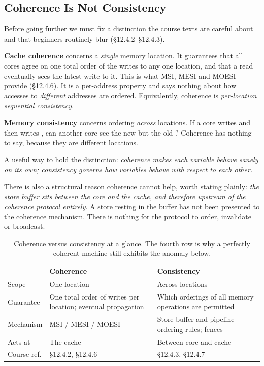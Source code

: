 \subsection{Coherence Is Not Consistency}

Before going further we must fix a distinction the course texts are careful
about and that beginners routinely blur (\S12.4.2--\S12.4.3).

\textbf{Cache coherence} concerns a \emph{single} memory location.
It guarantees that all cores agree on one total order of the writes to any one
location, and that a read eventually sees the latest write to it.
This is what MSI, MESI and MOESI provide (\S12.4.6).
It is a per-address property and says nothing about how accesses to
\emph{different} addresses are ordered.
Equivalently, coherence is \emph{per-location sequential consistency}.

\textbf{Memory consistency} concerns ordering \emph{across} locations.
If a core writes  and then writes , can another core see the new
 but the old ?
Coherence has nothing to say, because they are different locations.

A useful way to hold the distinction: \emph{coherence makes each variable behave
sanely on its own; consistency governs how variables behave with respect to each
other.}

There is also a structural reason coherence cannot help, worth stating plainly:
\emph{the store buffer sits between the core and the cache, and therefore
upstream of the coherence protocol entirely}.
A store resting in the buffer has not been presented to the coherence
mechanism.
There is nothing for the protocol to order, invalidate or broadcast.

\begin{table}[H]
\centering
\small
\begin{tabular}{@{}p{2.5cm}p{4.9cm}p{4.9cm}@{}}
\toprule
 & \textbf{Coherence} & \textbf{Consistency} \\
\midrule
Scope        & One location & Across locations \\
Guarantee    & One total order of writes per location; eventual propagation
             & Which orderings of all memory operations are permitted \\
Mechanism    & MSI / MESI / MOESI & Store-buffer and pipeline ordering rules;
               fences \\
Acts at      & The cache & Between core and cache \\
Course ref.  & \S12.4.2, \S12.4.6 & \S12.4.3, \S12.4.7 \\
\bottomrule
\end{tabular}
\caption{Coherence versus consistency at a glance. The fourth row is why a
perfectly coherent machine still exhibits the anomaly below.}
\label{tab:d1-coh}
\end{table}

